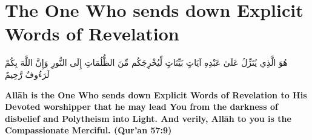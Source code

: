 \chapter{The One Who sends down Explicit Words of Revelation}
\begin{center}
    {\Huge    
        \begin{Arabic}
            هُوَ الَّذِي يُنَزِّلُ عَلَىٰ عَبْدِهِ آيَاتٍ بَيِّنَاتٍ لِّيُخْرِجَكُم مِّنَ الظُّلُمَاتِ إِلَى النُّورِ وَإِنَّ اللَّهَ بِكُمْ لَرَءُوفٌ رَّحِيمٌ
        \end{Arabic}
    }
\end{center}
\vspace*{\fill}
\vspace{3cm}
\begin{center}
    \large \textbf{Allāh is the One Who sends down Explicit Words of Revelation to His Devoted worshipper that he may lead You from the darkness of disbelief and Polytheism into Light. And verily, Allāh to you is the Compassionate Merciful. (Qur'an 57:9)}
\end{center}
